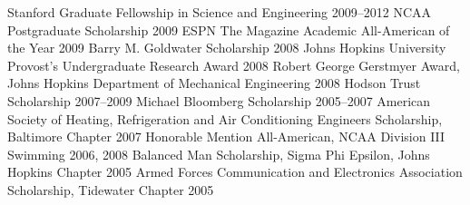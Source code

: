 
\begin{cvhonors}
  \cvhonor%
    {}
    {Stanford Graduate Fellowship in Science and Engineering}
    {}
    {2009--2012}
  \cvhonor%
    {}
    {NCAA Postgraduate Scholarship}
    {}
    {2009}
  \cvhonor%
    {}
    {ESPN The Magazine Academic All-American of the Year}
    {}
    {2009}
  \cvhonor%
    {}
    {Barry M. Goldwater Scholarship}
    {}
    {2008}
  \cvhonor%
    {}
    {Johns Hopkins University Provost's Undergraduate Research Award}
    {}
    {2008}
  \cvhonor%
    {}
    {Robert George Gerstmyer Award, Johns Hopkins Department of Mechanical Engineering}
    {}
    {2008}
  \cvhonor%
    {}
    {Hodson Trust Scholarship}
    {}
    {2007--2009}
  \cvhonor%
    {}
    {Michael Bloomberg Scholarship}
    {}
    {2005--2007}
  \cvhonor%
    {}
    {American Society of Heating, Refrigeration and Air Conditioning Engineers Scholarship, Baltimore Chapter}
    {}
    {2007}
  \cvhonor%
    {}
    {Honorable Mention All-American, NCAA Division III Swimming}
    {}
    {2006, 2008}
  \cvhonor%
    {}
    {Balanced Man Scholarship, Sigma Phi Epsilon, Johns Hopkins Chapter}
    {}
    {2005}
  \cvhonor%
    {}
    {Armed Forces Communication and Electronics Association Scholarship, Tidewater Chapter}
    {}
    {2005}
\end{cvhonors}
